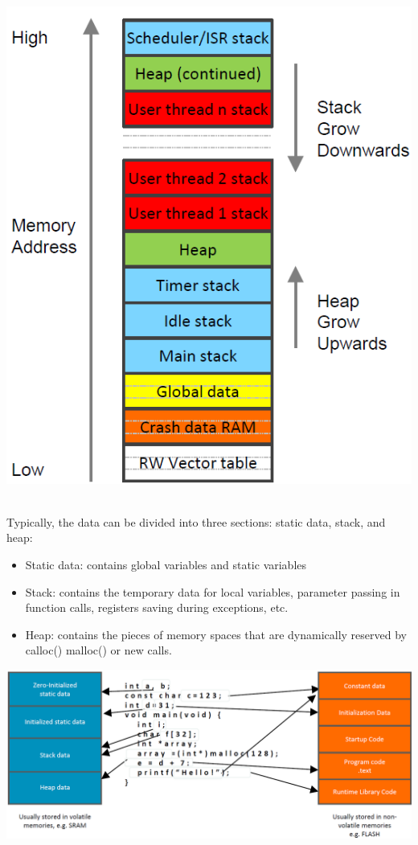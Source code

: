 \begin{minipage}{.49\columnwidth}
    \centering
    \includegraphics[width=\linewidth,height=\linewidth,keepaspectratio=false]{images/ram2.png} %
\end{minipage}\\
Typically, the data can be divided into three
sections: static data, stack, and heap:
\begin{itemize}
    \item Static data: contains global variables and static variables
    \item Stack: contains the temporary data for local variables, parameter passing in function calls, registers saving during exceptions, etc.
    \item Heap: contains the pieces of memory spaces that are dynamically reserved by calloc() malloc() or new calls.
\end{itemize}
\includegraphics*[width=\columnwidth]{images/datastorage_example.png}
